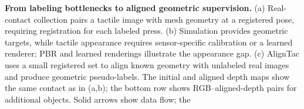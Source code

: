 \textbf{From labeling bottlenecks to aligned geometric supervision.}
    (a) Real-contact collection pairs a tactile image with mesh geometry at a registered pose, requiring registration for each labeled press.
    (b) Simulation provides geometric targets, while tactile appearance requires sensor-specific calibration or a learned renderer; PBR and learned renderings illustrate the appearance gap.
    (c) AlignTac uses a small registered set to align known geometry with unlabeled real images and produce geometric pseudo-labels.
    The initial and aligned depth maps show the same contact as in (a,b); the bottom row shows RGB--aligned-depth pairs for additional objects.
    Solid arrows show data flow; the 
